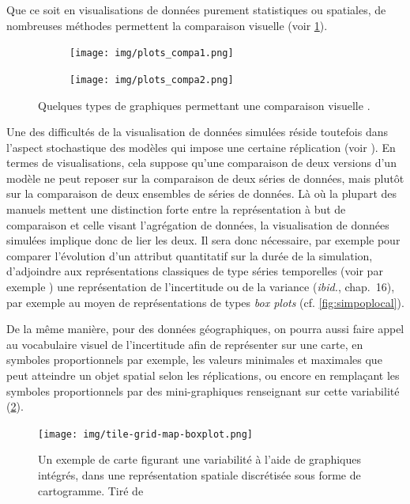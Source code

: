 \documentclass[a4paper, 12pt]{article}
\begin{document}
Que ce soit en visualisations de données purement statistiques ou spatiales, de nombreuses méthodes permettent la comparaison visuelle (voir \cref{fig:plots-comparaison}).

\begin{figure}[H]
	\centering
	\begin{subfigure}[t]{.45\linewidth}
		\vskip 0pt
		\texttt{[image: img/plots\_compa1.png]}
	\end{subfigure}%
	\begin{subfigure}[t]{.45\linewidth}
		\vskip 0pt
		\texttt{[image: img/plots\_compa2.png]}
	\end{subfigure}
	\caption{Quelques types de graphiques permettant une comparaison visuelle \autocite{ribecca2018data}.}
	\label{fig:plots-comparaison}
\end{figure}

Une des difficultés de la visualisation de données simulées réside toutefois dans l'aspect stochastique des modèles qui impose une certaine réplication (voir ).
En termes de visualisations, cela suppose qu'une comparaison de deux versions d'un modèle ne peut reposer sur la comparaison de deux séries de données, mais plutôt sur la comparaison de deux ensembles de séries de données.
Là où la plupart des manuels mettent une distinction forte entre la représentation à but de comparaison et celle visant l'agrégation de données, la visualisation de données simulées implique donc de lier les deux.
Il sera donc nécessaire, par exemple pour comparer l'évolution d'un attribut quantitatif sur la durée de la simulation, d'adjoindre aux représentations classiques de type séries temporelles (voir par exemple \textcite[chap.~13]{wilke_fundamentals_2019}) une représentation de l'incertitude ou de la variance (\textit{ibid.}, chap.~16), par exemple au moyen de représentations de types \textit{box plots} (cf. \cref{fig:simpoplocal}).

De la même manière, pour des données géographiques, on pourra aussi faire appel au vocabulaire visuel de l'incertitude afin de représenter sur une carte, en symboles proportionnels par exemple, les valeurs minimales et maximales que peut atteindre un objet spatial selon les réplications, ou encore en remplaçant les symboles proportionnels par des \og mini-graphiques\fg{} renseignant sur cette variabilité (\cref{fig:map-boxplots}).

\begin{figure}[H]
	\centering
	\texttt{[image: img/tile-grid-map-boxplot.png]}
	\caption{Un exemple de carte figurant une variabilité à l'aide de graphiques intégrés, dans une représentation spatiale discrétisée sous forme de cartogramme. Tiré de \textcite{ribecca_chart_2018}}
	\label{fig:map-boxplots}
\end{figure}	
\end{document}
